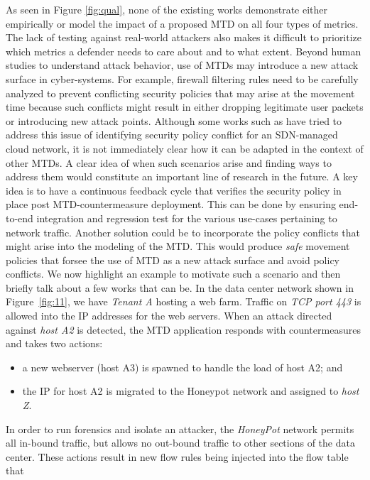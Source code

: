 {
As seen in Figure \ref{fig:qual}, none of the existing works demonstrate either empirically or model the impact of a proposed MTD on all four types of metrics. The lack of testing against real-world attackers also makes it difficult to prioritize which metrics a defender needs to care about and to what extent.
}
 {
Beyond human studies to understand attack behavior, use of MTDs may introduce a new attack surface in cyber-systems.}
For example, firewall filtering rules need to be carefully analyzed to prevent conflicting security policies that may arise at the movement time because such conflicts might result in either dropping legitimate user packets or introducing new attack points. Although some works such as  have tried to address this issue of identifying security policy conflict for an SDN-managed cloud network, it is not immediately clear how it can be adapted in the context of other MTDs. A clear idea of when such scenarios arise and finding ways to address them would constitute an important line of research in the future.
A key idea is to have a continuous feedback cycle that verifies the security policy in place post MTD-countermeasure deployment. This can be done by ensuring end-to-end integration and regression test for the various use-cases pertaining to network traffic. Another solution could be to incorporate the policy conflicts that might arise into the modeling of the MTD. This would produce {\em safe} movement policies that forsee the use of MTD as a new attack surface and avoid policy conflicts.
\iffalse
We now highlight an example to motivate such a scenario and then briefly talk about a few works that can be.
In the data center network shown in Figure~\ref{fig:11}, we have \emph{Tenant A} hosting a web farm. Traffic on \emph{TCP port 443} is allowed into the IP addresses for the web servers. When an attack directed against \emph{host A2} is detected, the MTD application responds with countermeasures and takes two actions: 
\begin{itemize}
    \item a new webserver ({host A3}) is spawned to handle the load of host A2; and 
    \item the IP for host A2 is migrated to the Honeypot network and assigned to \textit{host Z}.
\end{itemize}
In order to run forensics and isolate an attacker, the \textit{HoneyPot} network permits all in-bound traffic, but allows no out-bound traffic to other sections of the data center. These actions result in new flow rules being injected into the flow table that 
